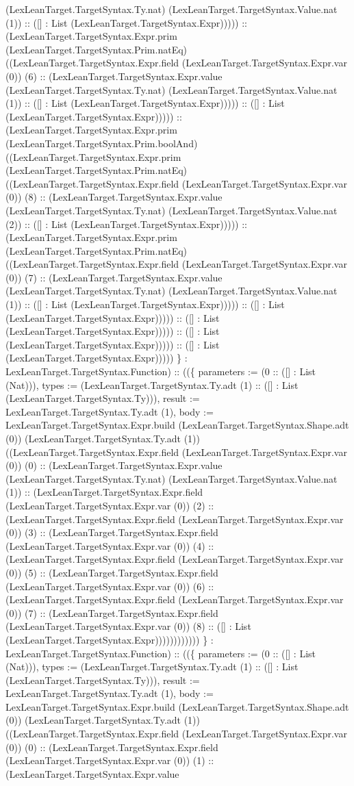 \documentclass[11pt]{article}
\begin{document}
(LexLeanTarget.TargetSyntax.Ty.nat) (LexLeanTarget.TargetSyntax.Value.nat (1)) :: ([] : List (LexLeanTarget.TargetSyntax.Expr))))) :: (LexLeanTarget.TargetSyntax.Expr.prim (LexLeanTarget.TargetSyntax.Prim.natEq) ((LexLeanTarget.TargetSyntax.Expr.field (LexLeanTarget.TargetSyntax.Expr.var (0)) (6) :: (LexLeanTarget.TargetSyntax.Expr.value (LexLeanTarget.TargetSyntax.Ty.nat) (LexLeanTarget.TargetSyntax.Value.nat (1)) :: ([] : List (LexLeanTarget.TargetSyntax.Expr))))) :: ([] : List (LexLeanTarget.TargetSyntax.Expr))))) :: (LexLeanTarget.TargetSyntax.Expr.prim (LexLeanTarget.TargetSyntax.Prim.boolAnd) ((LexLeanTarget.TargetSyntax.Expr.prim (LexLeanTarget.TargetSyntax.Prim.natEq) ((LexLeanTarget.TargetSyntax.Expr.field (LexLeanTarget.TargetSyntax.Expr.var (0)) (8) :: (LexLeanTarget.TargetSyntax.Expr.value (LexLeanTarget.TargetSyntax.Ty.nat) (LexLeanTarget.TargetSyntax.Value.nat (2)) :: ([] : List (LexLeanTarget.TargetSyntax.Expr))))) :: (LexLeanTarget.TargetSyntax.Expr.prim (LexLeanTarget.TargetSyntax.Prim.natEq) ((LexLeanTarget.TargetSyntax.Expr.field (LexLeanTarget.TargetSyntax.Expr.var (0)) (7) :: (LexLeanTarget.TargetSyntax.Expr.value (LexLeanTarget.TargetSyntax.Ty.nat) (LexLeanTarget.TargetSyntax.Value.nat (1)) :: ([] : List (LexLeanTarget.TargetSyntax.Expr))))) :: ([] : List (LexLeanTarget.TargetSyntax.Expr))))) :: ([] : List (LexLeanTarget.TargetSyntax.Expr))))) :: ([] : List (LexLeanTarget.TargetSyntax.Expr))))) :: ([] : List (LexLeanTarget.TargetSyntax.Expr))))) \} : LexLeanTarget.TargetSyntax.Function) :: ((\{ parameters := (0 :: ([] : List (Nat))), types := (LexLeanTarget.TargetSyntax.Ty.adt (1) :: ([] : List (LexLeanTarget.TargetSyntax.Ty))), result := LexLeanTarget.TargetSyntax.Ty.adt (1), body := LexLeanTarget.TargetSyntax.Expr.build (LexLeanTarget.TargetSyntax.Shape.adt (0)) (LexLeanTarget.TargetSyntax.Ty.adt (1)) ((LexLeanTarget.TargetSyntax.Expr.field (LexLeanTarget.TargetSyntax.Expr.var (0)) (0) :: (LexLeanTarget.TargetSyntax.Expr.value (LexLeanTarget.TargetSyntax.Ty.nat) (LexLeanTarget.TargetSyntax.Value.nat (1)) :: (LexLeanTarget.TargetSyntax.Expr.field (LexLeanTarget.TargetSyntax.Expr.var (0)) (2) :: (LexLeanTarget.TargetSyntax.Expr.field (LexLeanTarget.TargetSyntax.Expr.var (0)) (3) :: (LexLeanTarget.TargetSyntax.Expr.field (LexLeanTarget.TargetSyntax.Expr.var (0)) (4) :: (LexLeanTarget.TargetSyntax.Expr.field (LexLeanTarget.TargetSyntax.Expr.var (0)) (5) :: (LexLeanTarget.TargetSyntax.Expr.field (LexLeanTarget.TargetSyntax.Expr.var (0)) (6) :: (LexLeanTarget.TargetSyntax.Expr.field (LexLeanTarget.TargetSyntax.Expr.var (0)) (7) :: (LexLeanTarget.TargetSyntax.Expr.field (LexLeanTarget.TargetSyntax.Expr.var (0)) (8) :: ([] : List (LexLeanTarget.TargetSyntax.Expr)))))))))))) \} : LexLeanTarget.TargetSyntax.Function) :: ((\{ parameters := (0 :: ([] : List (Nat))), types := (LexLeanTarget.TargetSyntax.Ty.adt (1) :: ([] : List (LexLeanTarget.TargetSyntax.Ty))), result := LexLeanTarget.TargetSyntax.Ty.adt (1), body := LexLeanTarget.TargetSyntax.Expr.build (LexLeanTarget.TargetSyntax.Shape.adt (0)) (LexLeanTarget.TargetSyntax.Ty.adt (1)) ((LexLeanTarget.TargetSyntax.Expr.field (LexLeanTarget.TargetSyntax.Expr.var (0)) (0) :: (LexLeanTarget.TargetSyntax.Expr.field (LexLeanTarget.TargetSyntax.Expr.var (0)) (1) :: (LexLeanTarget.TargetSyntax.Expr.value 
\end{document}
